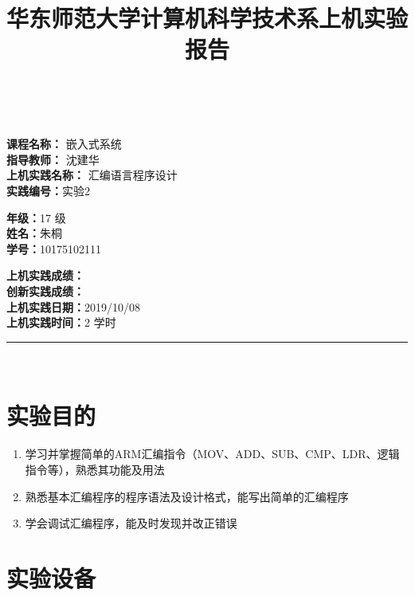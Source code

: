 \documentclass[a4paper,10pt,UTF8]{paper}
\title{华东师范大学计算机科学技术系上机实验报告}
\numberwithin{equation}{section}
\numberwithin{figure}{section}
\begin{document}
\pagestyle{fancy}
\lhead{}
\rhead{}
\makeatletter
\def\headrule{{\if@fancyplain\let\headrulewidth\plainheadrulewidth\fi%
	\color{gray}\hrule\@height 0.2pt\@width\headwidth}
	\vspace{6mm}}
\makeatother

\newcommand{\HRule}{\rule{\linewidth}{1mm}}
\newcommand{\dai}{\textbf{Dais-CMX16$^+$}}

{ \\ [0.8cm]
		
	\small{
		\begin{minipage}[t]{.32\linewidth}
			\textbf{课程名称：} 嵌入式系统\\
			\textbf{指导教师：} 沈建华\\
			\textbf{上机实践名称：} 汇编语言程序设计\\
			\textbf{实践编号：}实验2
		\end{minipage}
		\begin{minipage}[t]{.32\linewidth}
			\textbf{年级：}17 级\\
			\textbf{姓名：}朱桐\\
			\textbf{学号：}10175102111\\
		\end{minipage} 
		\begin{minipage}[t]{.32\linewidth}
			\textbf{上机实践成绩：} \\
			\textbf{创新实践成绩：} \\
			\textbf{上机实践日期：}2019/10/08\\
			\textbf{上机实践时间：}2 学时\\
		\end{minipage}
	}
	\HRule \\[0.5cm]
}
\section{实验目的}

\begin{enumerate}
	\item 学习并掌握简单的ARM汇编指令（MOV、ADD、SUB、CMP、LDR、逻辑指令等），熟悉其功能及用法
	\item 熟悉基本汇编程序的程序语法及设计格式，能写出简单的汇编程序
	\item 学会调试汇编程序，能及时发现并改正错误
\end{enumerate}

\section{实验设备}
\end{document}
